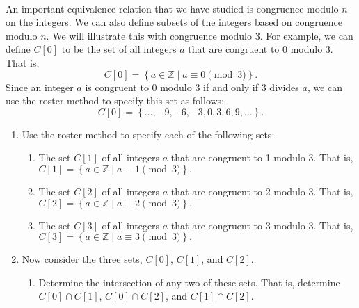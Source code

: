 \begin{previewactivity}\label{PA:congruencemodulo3} \hfill \\
An important equivalence relation that we have studied is congruence modulo $n$ on the integers.  We can also define subsets of the integers based on congruence modulo $n$.  We will illustrate this with congruence modulo 3.  For example, we can define $C[0]$ to be the set of all integers $a$ that are congruent to 0 modulo 3.  That is,
\[
C[ 0 ] = \left\{ { {a \in \mathbb{Z} } \mid a \equiv 0 \pmod 3} \right\}\!.
\]
Since an integer $a$ is congruent to 0 modulo 3 if and only if 3 divides $a$, we can use the roster method to specify this set as follows:
\[
C[0] = \left\{  \ldots, -9, -6, -3, 0, 3, 6, 9, \ldots \right\}.
\]

\begin{enumerate}
\item Use the roster method to specify each of the following sets:

\begin{enumerate}
%
\item The set  $C[ 1 ]$ of all integers  $a$  that are congruent to 1 modulo 3.   That is, 
\label{PA:congruencemodulo3-2}%
$C[ 1 ] = \left\{ { {a \in \mathbb{Z} } \mid a \equiv 1 \pmod 3} \right\}\!.$
%
\item The set  $C[ 2 ]$ of all integers  $a$  that are congruent to 2 modulo 3.   That is, 
\label{PA:congruencemodulo3-3}%
$C[ 2 ] = \left\{ { {a \in \mathbb{Z} } \mid a \equiv 2 \pmod 3} \right\}\!.$
%
\item The set  $C[ 3 ]$ of all integers  $a$  that are congruent to 3 modulo 3.   That is, 
$C[ 3 ] = \left\{ { {a \in \mathbb{Z} } \mid a \equiv 3 \pmod 3} \right\}\!.$
\end{enumerate}

\item Now consider the three sets, $C[ 0 ]$, $C[ 1 ]$, and $C[ 2 ]$. 
\begin{enumerate}
  \item Determine the intersection of any two of these sets.  That is,  determine  
  $C[ 0 ] \cap C[ 1 ]$, $C[ 0 ] \cap C[ 2 ]$,        and  $C[ 1 ] \cap C[ 2 ]$. 


\end{enumerate}
\end{enumerate}
\end{previewactivity}
